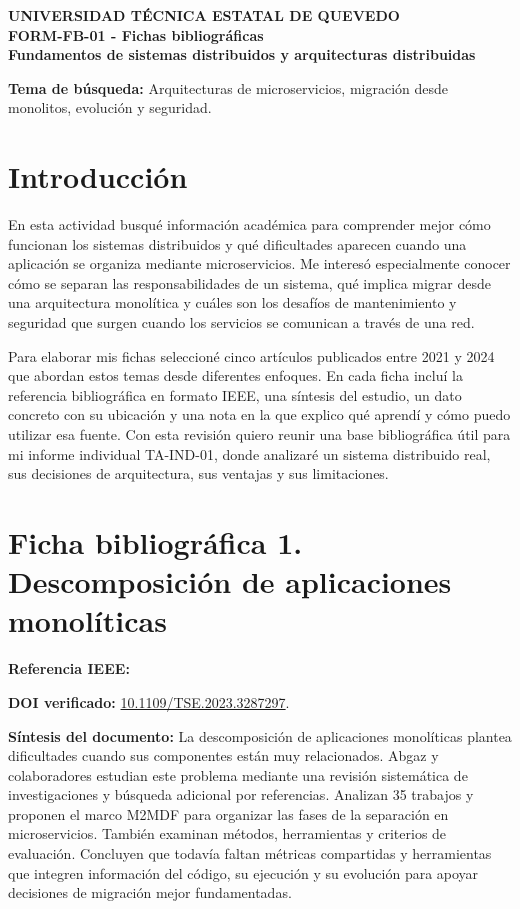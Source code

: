 \documentclass[12pt,a4paper]{article}
\newcommand{\resumen}[1]{\textbf{Síntesis del documento:} #1}
\begin{document}
	\begin{center}
		{\Large\textbf{UNIVERSIDAD TÉCNICA ESTATAL DE QUEVEDO}}\\[4pt]
		{\large\textbf{FORM-FB-01 - Fichas bibliográficas}}\\
		\textbf{Fundamentos de sistemas distribuidos y arquitecturas distribuidas}\\[8pt]
	\end{center}
	\textbf{Tema de búsqueda:} Arquitecturas de microservicios, migración desde monolitos, evolución y seguridad.
	
	\section*{Introducción}
	En esta actividad busqué información académica para comprender mejor cómo funcionan los sistemas distribuidos y qué dificultades aparecen cuando una aplicación se organiza mediante microservicios. Me interesó especialmente conocer cómo se separan las responsabilidades de un sistema, qué implica migrar desde una arquitectura monolítica y cuáles son los desafíos de mantenimiento y seguridad que surgen cuando los servicios se comunican a través de una red.
	
	Para elaborar mis fichas seleccioné cinco artículos publicados entre 2021 y 2024 que abordan estos temas desde diferentes enfoques. En cada ficha incluí la referencia bibliográfica en formato IEEE, una síntesis del estudio, un dato concreto con su ubicación y una nota en la que explico qué aprendí y cómo puedo utilizar esa fuente. Con esta revisión quiero reunir una base bibliográfica útil para mi informe individual TA-IND-01, donde analizaré un sistema distribuido real, sus decisiones de arquitectura, sus ventajas y sus limitaciones.
	
	\section*{Ficha bibliográfica 1. Descomposición de aplicaciones monolíticas}
	\textbf{Referencia IEEE:} 
	
	\textbf{DOI verificado:} \href{https://doi.org/10.1109/TSE.2023.3287297}{10.1109/TSE.2023.3287297}.\par
	
	\resumen{La descomposición de aplicaciones monolíticas plantea dificultades cuando sus componentes están muy relacionados. Abgaz y colaboradores estudian este problema mediante una revisión sistemática de investigaciones y búsqueda adicional por referencias. Analizan 35 trabajos y proponen el marco M2MDF para organizar las fases de la separación en microservicios. También examinan métodos, herramientas y criterios de evaluación. Concluyen que todavía faltan métricas compartidas y herramientas que integren información del código, su ejecución y su evolución para apoyar decisiones de migración mejor fundamentadas.}
	
\end{document}
